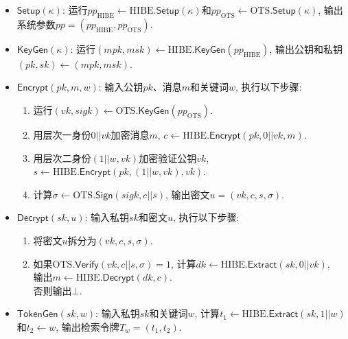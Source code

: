 \begin{construction}\label{construction:ch6-PKE-PEKS-1}
\begin{itemize}
	\item $\mathsf{Setup}(\kappa)$: 运行$pp_{\text{HIBE}} \leftarrow \text{HIBE}.\mathsf{Setup}(\kappa)$和$pp_{\text{OTS}} \leftarrow \text{OTS}.\mathsf{Setup}(\kappa)$, 输出系统参数$pp = (pp_{\text{HIBE}}, pp_{\text{OTS}})$.

	\item $\mathsf{KeyGen}(\kappa)$: 运行$(mpk, msk) \leftarrow \text{HIBE}.\mathsf{KeyGen}(pp_{\text{HIBE}})$, 输出公钥和私钥$(pk, sk) \leftarrow (mpk, msk)$.

	\item $\mathsf{Encrypt}(pk, m, w)$: 输入公钥$pk$、消息$m$和关键词$w$, 执行以下步骤:
		\begin{enumerate} \itemsep 1pt \parskip 0pt \parsep 0pt
			\item 运行$(vk, sigk) \leftarrow \text{OTS}.\mathsf{KeyGen}(pp_{\text{OTS}})$.
			\item 用层次一身份$0||vk$加密消息$m$, $c \leftarrow \text{HIBE}.\mathsf{Encrypt}(pk, 0||vk, m)$.
			\item 用层次二身份$(1||w, vk)$加密验证公钥$vk$, $s \leftarrow \text{HIBE}.\mathsf{Encrypt}(pk, (1||w, vk), vk)$.
			\item 计算$\sigma \leftarrow \text{OTS}.\mathsf{Sign}(sigk, c||s)$, 输出密文$u = (vk, c, s, \sigma)$.			
		\end{enumerate}

	\item $\mathsf{Decrypt}(sk, u)$: 输入私钥$sk$和密文$u$, 执行以下步骤:
		\begin{enumerate} \itemsep 1pt \parskip 0pt \parsep 0pt
			\item 将密文$u$拆分为$(vk, c, s, \sigma)$.
			\item 如果$\text{OTS}.\mathsf{Verify}(vk, c||s, \sigma) = 1$, 计算$dk \leftarrow \mathrm{HIBE}.\mathsf{Extract}(sk, 0||vk)$,\\
				\hspace*{2em} 输出$m \leftarrow \text{HIBE}.\mathsf{Decrypt}(dk, c)$.\\
                否则输出$\bot$.
		\end{enumerate}

	\item $\mathsf{TokenGen}(sk, w)$: 输入私钥$sk$和关键词$w$, 计算$t_1 \leftarrow \text{HIBE}.\mathsf{Extract}(sk, 1||w)$和$t_2 \leftarrow w$, 输出检索令牌$T_w = (t_1, t_2)$.\vspace{0.5em}
			

\end{itemize}
\end{construction}
